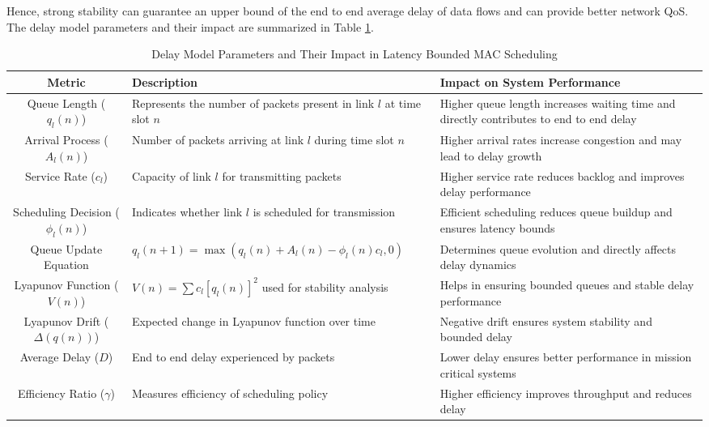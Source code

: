 \documentclass[a4paper,fleqn]{cas-dc}
\numberwithin{equation}{section}
\begin{document}
Hence, strong stability can guarantee an upper bound of the end to end average delay of data flows and can provide better network QoS. 
The delay model parameters and their impact are summarized in Table \ref{tab:delay_model}.
\begin{table}[t]
\centering
\renewcommand{\arraystretch}{1.3}
\caption{Delay Model Parameters and Their Impact in Latency Bounded MAC Scheduling}
\label{tab:delay_model}
\begin{tabular}{|c|p{5cm}|p{5cm}|}
\hline
\textbf{Metric} & \textbf{Description} & \textbf{Impact on System Performance} \\
\hline

Queue Length ($q_l(n)$) 
& Represents the number of packets present in link $l$ at time slot $n$ 
& Higher queue length increases waiting time and directly contributes to end to end delay \\
\hline

Arrival Process ($A_l(n)$) 
& Number of packets arriving at link $l$ during time slot $n$ 
& Higher arrival rates increase congestion and may lead to delay growth \\
\hline

Service Rate ($c_l$) 
& Capacity of link $l$ for transmitting packets 
& Higher service rate reduces backlog and improves delay performance \\
\hline

Scheduling Decision ($\phi_l(n)$) 
& Indicates whether link $l$ is scheduled for transmission 
& Efficient scheduling reduces queue buildup and ensures latency bounds \\
\hline

Queue Update Equation 
& $q_l(n+1) = \max(q_l(n) + A_l(n) - \phi_l(n)c_l, 0)$ 
& Determines queue evolution and directly affects delay dynamics \\
\hline

Lyapunov Function ($V(n)$) 
& $V(n) = \sum c_l [q_l(n)]^2$ used for stability analysis 
& Helps in ensuring bounded queues and stable delay performance \\
\hline

Lyapunov Drift ($\Delta(q(n))$) 
& Expected change in Lyapunov function over time 
& Negative drift ensures system stability and bounded delay \\
\hline

Average Delay ($D$) 
& End to end delay experienced by packets 
& Lower delay ensures better performance in mission critical systems \\
\hline

Efficiency Ratio ($\gamma$) 
& Measures efficiency of scheduling policy 
& Higher efficiency improves throughput and reduces delay \\
\hline

\end{tabular}
\end{table}
\end{document}
